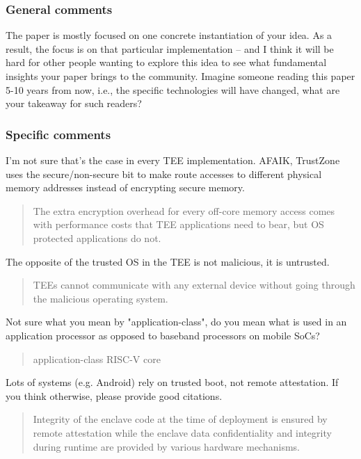 \documentclass[9pt]{article}
\begin{document}
\subsubsection{General comments}

The paper is mostly focused on one concrete instantiation of your idea.
As a result, the focus is on that particular implementation -- and I
think it will be hard for other people wanting to explore this idea to
see what fundamental insights your paper brings to the community.
Imagine someone reading this paper 5-10 years from now, i.e., the
specific technologies will have changed, what are your takeaway for such
readers?

\subsubsection{Specific comments}

I'm not sure that's the case in every TEE implementation. AFAIK,
TrustZone uses the secure/non-secure bit to make route accesses to
different physical memory addresses instead of encrypting secure memory.

\begin{quote}
The extra encryption overhead for every off-core memory access comes
with performance costs that TEE applications need to bear, but OS
protected applications do not.
\end{quote}

The opposite of the trusted OS in the TEE is not malicious, it is
untrusted.

\begin{quote}
TEEs cannot communicate with any external device without going through
the malicious operating system.
\end{quote}

Not sure what you mean by "application-class", do you mean what is used
in an application processor as opposed to baseband processors on mobile
SoCs?

\begin{quote}
application-class RISC-V core
\end{quote}

Lots of systems (e.g. Android) rely on trusted boot, not remote
attestation. If you think otherwise, please provide good citations.

\begin{quote}
Integrity of the enclave code at the time of deployment is ensured by
remote attestation while the enclave data conﬁdentiality and integrity
during runtime are provided by various hardware mechanisms.
\end{quote}
\end{document}
